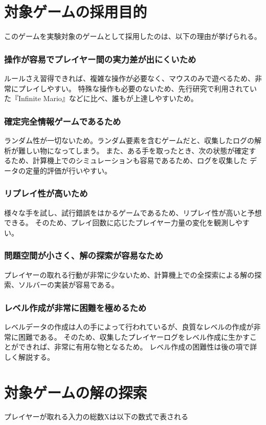 \section{対象ゲームの採用目的}
このゲームを実験対象のゲームとして採用したのは、以下の理由が挙げられる。
\subsubsection{操作が容易でプレイヤー間の実力差が出にくいため}
ルールさえ習得できれば、複雑な操作が必要なく、マウスのみで遊べるため、非常にプレイしやすい。
特殊な操作も必要のないため、先行研究で利用されていた『Infinite Mario』などに比べ、誰もが上達しやすいため。
\subsubsection{確定完全情報ゲームであるため}
ランダム性が一切ないため。ランダム要素を含むゲームだと、収集したログの解析が難しい物になってしまう。
また、ある手を取ったとき、次の状態が確定するため、計算機上でのシミュレーションも容易であるため、ログを収集した
データの定量的評価が行いやすい。
\subsubsection{リプレイ性が高いため}
様々な手を試し、試行錯誤をはかるゲームであるため、リプレイ性が高いと予想できる。
そのため、プレイ回数に応じたプレイヤー力量の変化を観測しやすい。

\subsubsection{問題空間が小さく、解の探索が容易なため}
プレイヤーの取れる行動が非常に少ないため、計算機上での全探索による解の探索、ソルバーの実装が容易である。

\subsubsection{レベル作成が非常に困難を極めるため}
レベルデータの作成は人の手によって行われているが、良質なレベルの作成が非常に困難である。
そのため、収集したプレイヤーログをレベル作成に生かすことができれば、非常に有用な物となるため。
レベル作成の困難性は後の項で詳しく解説する。


\section{対象ゲームの解の探索}
プレイヤーが取れる入力の総数Xは以下の数式で表される


